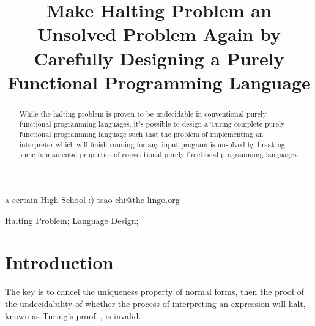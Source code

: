 \documentclass[10pt,preprint,numbers]{sigplanconf}
\begin{document}

\title{Make Halting Problem an Unsolved Problem Again by Carefully Designing a Purely Functional Programming Language}

           {a certain High School :)}
           {tsao-chi@the-lingo.org}

\maketitle

\begin{abstract}

While the halting problem is proven to be undecidable in conventional purely functional programming languages,
it's possible to design a Turing-complete purely functional programming language
such that the problem of implementing an interpreter which will finish running for any input program is unsolved
by breaking some fundamental properties of conventional purely functional programming languages.
\end{abstract}

{\footnotesize
{}
\keywords
Halting Problem; Language Design;
}


\section{Introduction}

The key is to cancel the uniqueness property of normal forms, then the proof of the undecidability of whether the process of interpreting an expression will halt, known as Turing's proof~\citep{turing_paper}, is invalid.
\end{document}

